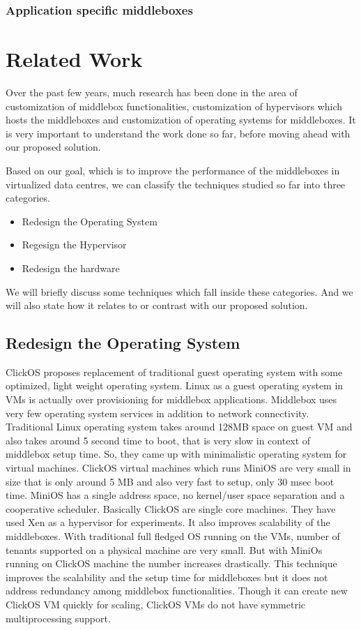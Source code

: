 \documentclass[a4paper,11pt]{report}
\begin{document}
\subsection{Application specific middleboxes}

\chapter{Related Work}
\noindent Over the past few years, much research has been done in the area of customization of middlebox functionalities, customization of hypervisors which hosts the middleboxes and customization of operating systems for middleboxes. It is very important to understand the work done so far, before moving ahead with our proposed solution.

Based on our goal, which is to improve the performance of the middleboxes in virtualized data centres, we can classify the techniques studied so far into three categories.
\begin{itemize}
\item Redesign the Operating System
\item Regesign the Hypervisor
\item Redesign the hardware
\end{itemize}
We will briefly discuss some techniques which fall inside these categories. And we will also state how it relates to or contrast with our proposed solution.
\section{Redesign the Operating System}
ClickOS\cite{R1} proposes replacement of traditional guest operating system with some optimized, light weight operating system. Linux as a guest operating system in VMs is actually over provisioning for middlebox applications. Middlebox uses very few operating system services in addition to network connectivity. Traditional Linux operating system takes around 128MB space on guest VM and also takes around 5 second time to boot, that is very slow in context of middlebox setup time. So, they came up with minimalistic operating system for virtual machines. ClickOS virtual machines which runs MiniOS are very small in size that is only around 5 MB and also very fast to setup, only 30 msec boot time. MiniOS has a single address space, no kernel/user space separation and a cooperative scheduler. Basically ClickOS are single core machines. They have used Xen as a hypervisor for experiments. It also improves scalability of the middleboxes. With traditional full fledged OS running on the VMs, number of tenants supported on a physical machine are very small. But with MiniOs running on ClickOS machine the number increases drastically. This technique improves the scalability and the setup time for middleboxes but it does not address redundancy among middlebox functionalities. Though it can create new ClickOS VM quickly for scaling, ClickOS VMs do not have symmetric multiprocessing support.             
\end{document}
